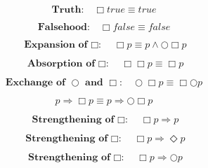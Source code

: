 \documentclass[fleqn, leqno]{article}
\newcommand{\Next}{\bigcirc}
\newcommand{\Event}{\Diamond}
\newcommand{\Always}{\Box}
\newcommand{\spacer}{\vspace{-30pt}}
\begin{document}
\spacer

\begin{equation}\label{E:alwaysTrue}
\textbf{Truth:}\quad \Always true \equiv true
\end{equation}

\spacer

\begin{equation}\label{E:alwaysFalse}
\textbf{Falsehood:}\quad \Always false \equiv false
\end{equation}

\spacer

\begin{equation}\label{E:expansionAlways}
\textbf{Expansion of $\Always$:}\quad \Always p \equiv p \land \Next\Always p
\end{equation}

\spacer

\begin{equation}\label{E:IdemAlways}
\textbf{Absorption of $\Always$:}\quad \Always\Always p \equiv \Always p
\end{equation}

\spacer

\begin{equation}\label{E:dNextAlways}
\textbf{Exchange of $\Next$ and $\Always$:}\quad \Next\Always p \equiv \Always\Next p
\end{equation}

\spacer

\begin{equation}\label{E:impNext}
p \Rightarrow \Always p \equiv p \Rightarrow \Next\Always p
\end{equation}

\spacer

\begin{equation}\label{E:impAlways}
\textbf{Strengthening of $\Always$:}\quad \Always p \Rightarrow p
\end{equation}

\spacer

\begin{equation}\label{E:impAlwaysE}
\textbf{Strengthening of $\Always$:}\quad \Always p \Rightarrow \Event p
\end{equation}

\spacer

\begin{equation}\label{E:impAlwaysN}
\textbf{Strengthening of $\Always$:}\quad \Always p \Rightarrow \Next p
\end{equation}
\end{document}
